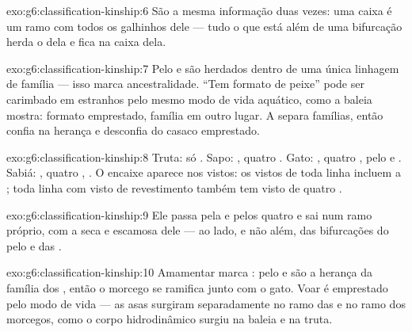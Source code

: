 \begin{solution}{exo:g6:classification-kinship:6}
São a mesma informação duas vezes: uma caixa é um ramo com todos os
galhinhos dele --- tudo o que está além de uma bifurcação herda o
 dela e fica na caixa dela.
\end{solution}

\begin{solution}{exo:g6:classification-kinship:7}
Pelo e  são herdados dentro de uma única linhagem de família ---
isso marca ancestralidade. ``Tem formato de peixe'' pode ser carimbado
em estranhos pelo mesmo modo de vida aquático, como a baleia mostra:
formato emprestado, família em outro lugar. A  separa
famílias, então confia na herança e desconfia do casaco emprestado.
\end{solution}

\begin{solution}{exo:g6:classification-kinship:8}
Truta: só . Sapo: , quatro .
Gato: , quatro , pelo e . Sabiá: , quatro , . O encaixe aparece nos vistos: os
vistos de toda linha incluem a ; toda linha com visto
de revestimento também tem visto de quatro .
\end{solution}

\begin{solution}{exo:g6:classification-kinship:9}
Ele passa pela  e pelos quatro  e sai num ramo
próprio, com a  seca e escamosa dele --- ao lado, e não além, das
bifurcações do pelo e das .
\end{solution}

\begin{solution}{exo:g6:classification-kinship:10}
Amamentar marca : pelo e  são a herança da família dos
, então o morcego se ramifica junto com o gato. Voar é
emprestado pelo modo de vida --- as asas surgiram separadamente no ramo
das  e no ramo dos morcegos, como o corpo hidrodinâmico surgiu na
baleia e na truta.
\end{solution}


